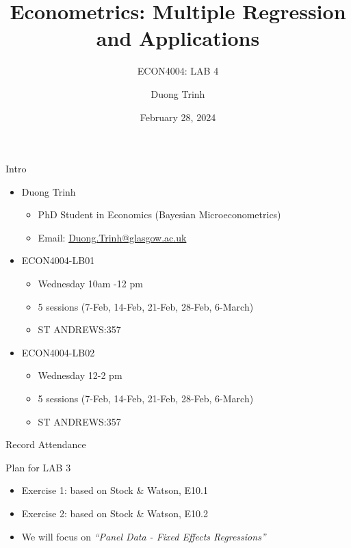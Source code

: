 \documentclass[
  10pt,
  ignorenonframetext,
]{beamer}
\title{Econometrics: Multiple Regression and Applications}
\subtitle{ECON4004: LAB 4}
\author{Duong Trinh}
\date{February 28, 2024}
\institute{University of Glasgow}
\providecommand{\tightlist}{%
  \setlength{\itemsep}{0pt}\setlength{\parskip}{0pt}}
\begin{document}
\frame{\titlepage}

\begin{frame}{Intro}
\protect\hypertarget{intro}{}
\begin{itemize}
\tightlist
\item
  Duong Trinh

  \begin{itemize}
  \tightlist
  \item
    PhD Student in Economics (Bayesian Microeconometrics)
  \item
    Email: \underline{Duong.Trinh@glasgow.ac.uk}
  \end{itemize}
\end{itemize}

\vspace{3mm}

\begin{itemize}
\tightlist
\item
  ECON4004-LB01

  \begin{itemize}
  \tightlist
  \item
    Wednesday 10am -12 pm
  \item
    5 sessions (7-Feb, 14-Feb, 21-Feb, 28-Feb, 6-March)
  \item
    ST ANDREWS:357
  \end{itemize}
\item
  ECON4004-LB02

  \begin{itemize}
  \tightlist
  \item
    Wednesday 12-2 pm
  \item
    5 sessions (7-Feb, 14-Feb, 21-Feb, 28-Feb, 6-March)
  \item
    ST ANDREWS:357
  \end{itemize}
\end{itemize}
\end{frame}

\begin{frame}{Record Attendance}
\protect\hypertarget{record-attendance}{}
\end{frame}

\begin{frame}{Plan for LAB 3}
\protect\hypertarget{plan-for-lab-3}{}
\begin{itemize}
\tightlist
\item
  Exercise 1: based on Stock \& Watson, E10.1
\item
  Exercise 2: based on Stock \& Watson, E10.2
\end{itemize}

\vspace{3mm}

\begin{itemize}
\tightlist
\item
  We will focus on \emph{``Panel Data - Fixed Effects Regressions''}
\end{itemize}
\end{frame}
\end{document}
